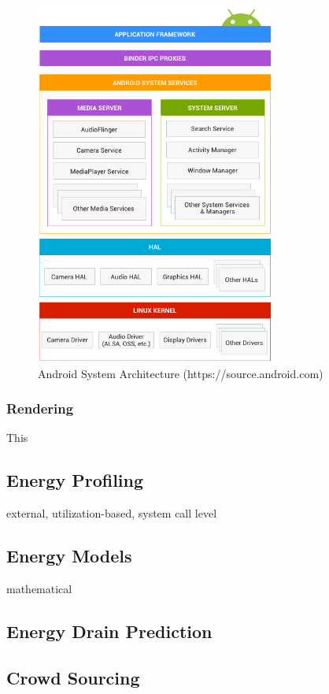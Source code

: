 \begin{figure}[h]
	\begin{center}	
	\includegraphics[width=0.7\textwidth]{Figures/c1architecture.png}
   \end{center}
	\caption{Android System Architecture \small(https://source.android.com)}
	\label{fig:androidarch}
\end{figure} 

\subsubsection*{Rendering}
This 


\subsection{Energy Profiling}
external, utilization-based, system call level
\subsection{Energy Models}
mathematical
\subsection{Energy Drain Prediction}
\subsection{Crowd Sourcing}
